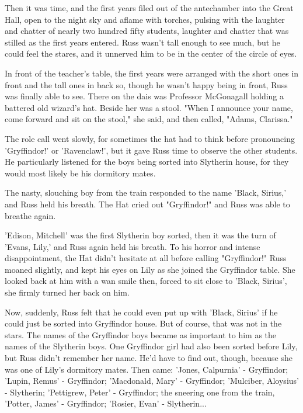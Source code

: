 \documentclass[a4paper,11pt]{article}
\begin{document}
Then it was time, and the first years filed out of the antechamber into the Great Hall, open to the night sky and aflame with torches, pulsing with the laughter and chatter of nearly two hundred fifty students, laughter and chatter that was stilled as the first years entered. Russ wasn't tall enough to see much, but he could feel the stares, and it unnerved him to be in the center of the circle of eyes.

In front of the teacher's table, the first years were arranged with the short ones in front and the tall ones in back so, though he wasn't happy being in front, Russ was finally able to see. There on the dais was Professor McGonagall holding a battered old wizard's hat. Beside her was a stool. "When I announce your name, come forward and sit on the stool," she said, and then called, "Adams, Clarissa."

The role call went slowly, for sometimes the hat had to think before pronouncing 'Gryffindor!' or 'Ravenclaw!', but it gave Russ time to observe the other students. He particularly listened for the boys being sorted into Slytherin house, for they would most likely be his dormitory mates.

The nasty, slouching boy from the train responded to the name 'Black, Sirius,' and Russ held his breath. The Hat cried out "Gryffindor!" and Russ was able to breathe again.

'Edison, Mitchell' was the first Slytherin boy sorted, then it was the turn of 'Evans, Lily,' and Russ again held his breath. To his horror and intense disappointment, the Hat didn't hesitate at all before calling "Gryffindor!" Russ moaned slightly, and kept his eyes on Lily as she joined the Gryffindor table. She looked back at him with a wan smile then, forced to sit close to 'Black, Sirius', she firmly turned her back on him.

Now, suddenly, Russ felt that he could even put up with 'Black, Sirius' if he could just be sorted into Gryffindor house. But of course, that was not in the stars. The names of the Gryffindor boys became as important to him as the names of the Slytherin boys. One Gryffindor girl had also been sorted before Lily, but Russ didn't remember her name. He'd have to find out, though, because she was one of Lily's dormitory mates. Then came: 'Jones, Calpurnia' - Gryffindor; 'Lupin, Remus' - Gryffindor; 'Macdonald, Mary' - Gryffindor; 'Mulciber, Aloysius' - Slytherin; 'Pettigrew, Peter' - Gryffindor; the sneering one from the train, 'Potter, James' - Gryffindor; 'Rosier, Evan' - Slytherin...
\end{document}

